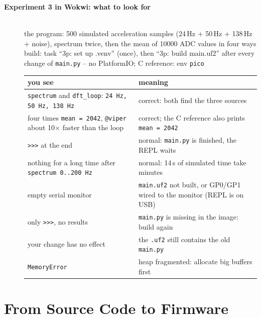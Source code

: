 \begin{description}
\item[{\rot\bf Experiment 3 in Wokwi: what to look for}]~\\[-\lblskip]
\bi
	\ite the program: 500 simulated acceleration samples (24\,Hz + 50\,Hz + 138\,Hz + noise), spectrum twice, then the mean of 10000 ADC values in four ways
	\ite build: task ``3p: set up .venv'' (once), then ``3p: build main.uf2'' after every change of \texttt{main.py} -- no PlatformIO; C reference: env \texttt{pico}
\ei
\begin{center}
{\small%
\begin{tabularx}{\linewidth}{|L|L|}
\hline
\textbf{you see} & \textbf{meaning} \\
\hline
\texttt{spectrum} and \texttt{dft\_loop}: \texttt{24 Hz, 50 Hz, 138 Hz} & correct: both find the three sources \\
four times \texttt{mean = 2042}, \texttt{@viper} about 10$\times$ faster than the loop & correct; the C reference also prints \texttt{mean = 2042} \\
\texttt{>>>} at the end & normal: \texttt{main.py} is finished, the REPL waits \\
nothing for a long time after \texttt{spectrum 0..200 Hz} & normal: 14\,s of simulated time take minutes \\
empty serial monitor & \texttt{main.uf2} not built, or GP0/GP1 wired to the monitor (REPL is on USB) \\
only \texttt{>>>}, no results & \texttt{main.py} is missing in the image: build again \\
your change has no effect & the \texttt{.uf2} still contains the old \texttt{main.py} \\
\texttt{MemoryError} & heap fragmented: allocate big buffers first \\
\hline
\end{tabularx}}
\end{center}
\os{\newpage}
\end{description}

\section{From Source Code to Firmware}

